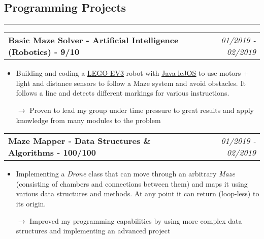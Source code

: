 \documentclass[10pt,letterpaper]{article}
\makeatletter
\newcommand{\headerrow}[2]
{\begin{tabular*}{\linewidth}{l@{\extracolsep{\fill}}r}
	#1 &
	#2 \\
\end{tabular*}}
\makeatother
\begin{document}
\subsection*{Programming Projects}
\hrule
\vspace{0.4em}

\noindent
\headerrow{\textbf{Basic Maze Solver - Artificial Intelligence (Robotics) - 9/10}}{\emph{01/2019 - 02/2019}}
\vspace{-1.6em}
\begin{itemize}
    \setlength\itemsep{0em}
    \item Building and coding a \href{https://www.lego.com/en-us/mindstorms/about-ev3}{\underline{LEGO EV3}} robot with \href{http://www.lejos.org}{\underline{Java leJOS}} to use motors + light and distance sensors to follow a Maze system and avoid obstacles. It follows a line and detects different markings for various instructions.
    \item[$\rightarrow$] Proven to lead my group under time pressure to great results and apply knowledge from many modules to the problem 
\end{itemize}

\noindent
\headerrow{\textbf{Maze Mapper - Data Structures \& Algorithms - 100/100}}{\emph{01/2019 - 02/2019}}
\vspace{-1.6em}
\begin{itemize}
    \setlength\itemsep{0em}
    \item Implementing a \emph{Drone} class that can move through an arbitrary \emph{Maze} (consisting of chambers and connections between them) and maps it using various data structures and methods. At any point it can return (loop-less) to its origin.
    \item[$\rightarrow$] Improved my programming capabilities by using more complex data structures and implementing an advanced project
\end{itemize}
\vspace{0.4em}
\end{document}
